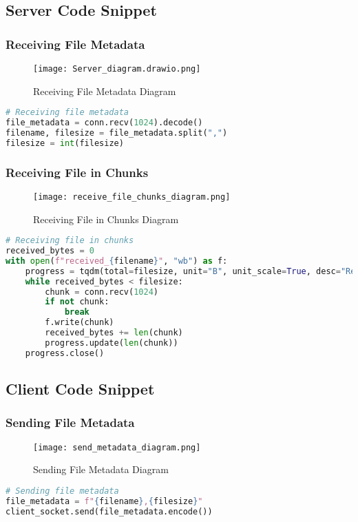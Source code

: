 \documentclass[a4paper,12pt]{article}
\begin{document}
\subsection{Server Code Snippet}

\subsubsection{Receiving File Metadata}
\begin{figure}[H]
    \centering
    \texttt{[image: Server\_diagram.drawio.png]}
    \caption{Receiving File Metadata Diagram}
\end{figure}
\begin{lstlisting}[language=Python]
# Receiving file metadata
file_metadata = conn.recv(1024).decode()
filename, filesize = file_metadata.split(",")
filesize = int(filesize)
\end{lstlisting}

\subsubsection{Receiving File in Chunks}

\begin{figure}[H]
    \centering
    \texttt{[image: receive\_file\_chunks\_diagram.png]}
    \caption{Receiving File in Chunks Diagram}
\end{figure}

\begin{lstlisting}[language=Python]
# Receiving file in chunks
received_bytes = 0
with open(f"received_{filename}", "wb") as f:
    progress = tqdm(total=filesize, unit="B", unit_scale=True, desc="Receiving")
    while received_bytes < filesize:
        chunk = conn.recv(1024)
        if not chunk:
            break
        f.write(chunk)
        received_bytes += len(chunk)
        progress.update(len(chunk))
    progress.close()
\end{lstlisting}

\subsection{Client Code Snippet}

\subsubsection{Sending File Metadata}
\begin{figure}[H]
    \centering
    \texttt{[image: send\_metadata\_diagram.png]}
    \caption{Sending File Metadata Diagram}
\end{figure}
\begin{lstlisting}[language=Python]
# Sending file metadata
file_metadata = f"{filename},{filesize}"
client_socket.send(file_metadata.encode())
\end{lstlisting}
\end{document}
